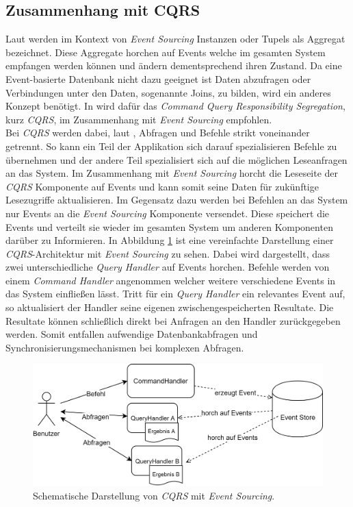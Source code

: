 \subsection{Zusammenhang mit CQRS}
\label{sub:transaction:cqrs}
Laut \cite{vernon2013implementing} werden im Kontext von \textit{Event Sourcing} Instanzen oder Tupels als Aggregat bezeichnet. Diese Aggregate horchen auf Events welche im gesamten System empfangen werden können und ändern dementsprechend ihren Zustand. Da eine Event-basierte Datenbank nicht dazu geeignet ist Daten abzufragen oder Verbindungen unter den Daten, sogenannte Joins, zu bilden, wird ein anderes Konzept benötigt. In \cite{vernon2013implementing} wird dafür das \textit{Command Query Responsibility Segregation}, kurz \textit{CQRS}, im Zusammenhang mit \textit{Event Sourcing} empfohlen. \\
Bei \textit{CQRS} werden dabei, laut \cite{cqrsYoung2010}, Abfragen und Befehle strikt voneinander getrennt. So kann ein Teil der Applikation sich darauf spezialisieren Befehle zu übernehmen und der andere Teil spezialisiert sich auf die möglichen Leseanfragen an das System. Im Zusammenhang mit \textit{Event Sourcing} horcht die Leseseite der \textit{CQRS} Komponente auf Events und kann somit seine Daten für zukünftige Lesezugriffe aktualisieren. Im Gegensatz dazu werden bei Befehlen an das System nur Events an die \textit{Event Sourcing} Komponente versendet. Diese speichert die Events und verteilt sie wieder im gesamten System um anderen Komponenten darüber zu Informieren. In Abbildung \ref{fig:transactionTheory:eventSourcing:cqrs} ist eine vereinfachte Darstellung einer \textit{CQRS}-Architektur mit \textit{Event Sourcing} zu sehen. Dabei wird dargestellt, dass zwei unterschiedliche \textit{Query Handler} auf Events horchen. Befehle werden von einem \textit{Command Handler} angenommen welcher weitere verschiedene Events in das System einfließen lässt. Tritt für ein \textit{Query Handler} ein relevantes Event auf, so aktualisiert der Handler seine eigenen zwischengespeicherten Resultate. Die Resultate können schließlich direkt bei Anfragen an den Handler zurückgegeben werden. Somit entfallen aufwendige Datenbankabfragen und Synchronisierungsmechanismen bei komplexen Abfragen. \\

\begin{figure}
  \centering
  \includegraphics[width=\linewidth]{gfx/other/eventSourcingCqrs}
  \caption{Schematische Darstellung von \textit{CQRS} mit \textit{Event Sourcing}.}
  \label{fig:transactionTheory:eventSourcing:cqrs}
\end{figure}

